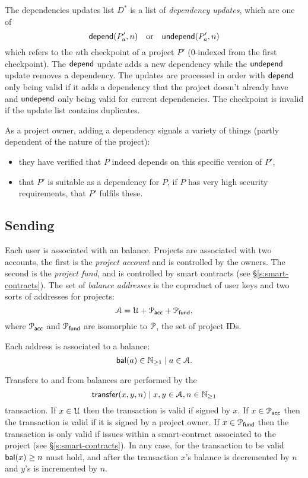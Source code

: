 The dependencies updates list $D^*$ is a list of \emph{dependency
  updates}, which are one of
\[
    \mathsf{depend}(P'_a, n) \quad \text{or} \quad \mathsf{undepend}(P'_a, n)
\]
which refers to the $n$th checkpoint of a project $P'$ ($0$-indexed
from the first checkpoint). The $\mathsf{depend}$ update adds a new dependency
while the $\mathsf{undepend}$ update removes a dependency. The updates are
processed in order with $\mathsf{depend}$ only being valid if it adds a
dependency that the project doesn't already have and $\mathsf{undepend}$
only being valid for current dependencies. The checkpoint is invalid
if the update list contains duplicates.

As a project owner, adding a dependency signals a variety of things
(partly dependent of the nature of the project):
\begin{itemize}
\item they have verified that $P$ indeed depends on this specific
  version of $P'$,
\item that $P'$ is suitable as a dependency for $P$, \eg{} if $P$ has
  very high security requirements, that $P'$ fulfils these.
\end{itemize}


\def\posnat{\mathbb{N}_{\geq 1}}

\subsection{Sending \oscoin{}}
\label{s:sending}

Each user is associated with an \oscoin{} balance. Projects are associated with
two accounts, the first is the \emph{project account} and is controlled by the
owners. The second is the \emph{project fund}, and is controlled by smart
contracts (see \S \ref{s:smart-contracts}). The set of \emph{balance addresses}
is the coproduct of user keys and two sorts of addresses for projects:
\[
\mathcal{A} = \mathcal{U} + \mathcal{P}_{\mathsf{acc}} + \mathcal{P}_{\mathsf{fund}},
\]
where $\mathcal{P}_{\mathsf{acc}}$ and $\mathcal{P}_{\mathsf{fund}}$ are isomorphic to
$\mathcal{P}$, the set of project IDs.

Each address is associated to a balance:
\[
\bal(a) \in \posnat \mid a \in \accAddrs.
\]

Transfers to and from balances are performed by the
\[
\tx{transfer}{x,y,n} \mid x,y \in \accAddrs, n \in \posnat
\]
transaction. If $x \in \mathcal{U}$ then the transaction is valid if signed by
$x$. If $x \in \mathcal{P}_{\mathsf{acc}}$ then the transaction is valid if it is
signed by a project owner. If $x \in \mathcal{P}_{\mathsf{fund}}$ then the transaction
is only valid if issues within a smart-contract associated to the project (see
\S \ref{s:smart-contracts}). In any case, for the transaction to be valid
$\mathsf{bal}(x) \geq n$ must hold, and after the transaction $x$'s balance is
decremented by $n$ and $y$'s is incremented by $n$.


